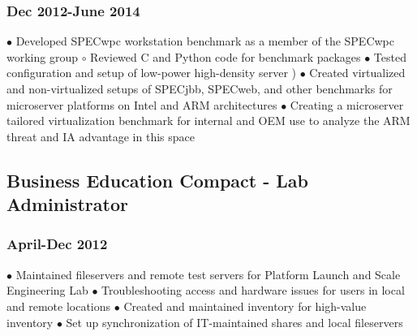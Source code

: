 \documentclass{article}
\begin{document}
\subsubsection*{Dec 2012-June 2014}

$\bullet$ Developed SPECwpc workstation benchmark as a member of the SPECwpc working group
$  \circ$ Reviewed C and Python code for benchmark packages
$\bullet$ Tested configuration and setup of low-power high-density server )
$\bullet$ Created virtualized and non-virtualized setups of SPECjbb, SPECweb, and other benchmarks for microserver platforms on Intel and ARM architectures
$\bullet$ Creating a microserver tailored virtualization benchmark for internal and OEM use to analyze the ARM threat and IA advantage in this space

\subsection*{Business Education Compact - Lab Administrator}
\subsubsection*{April-Dec 2012}

$\bullet$ Maintained fileservers and remote test servers for Platform Launch and Scale Engineering Lab
$\bullet$ Troubleshooting access and hardware issues for users in local and remote locations
$\bullet$ Created and maintained inventory for high-value inventory
$\bullet$ Set up synchronization of IT-maintained shares and local fileservers
\end{document}
